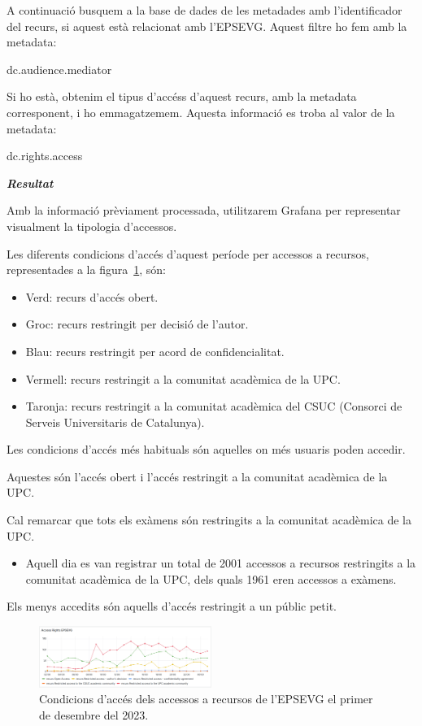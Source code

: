 \documentclass[lettersize,journal]{IEEEtran}
\begin{document}
A continuació busquem a la base de dades de les metadades amb l'identificador del recurs, si aquest està relacionat amb l'EPSEVG.
Aquest filtre ho fem amb la metadata:
\begin{center}
    {dc.audience.mediator}
\end{center}

Si ho està, obtenim el tipus d'accéss d'aquest recurs, amb la metadata corresponent, i ho emmagatzemem.
Aquesta informació es troba al valor de la metadata:
\begin{center}
    {dc.rights.access}
\end{center}

\textit{\textbf{Resultat}}

Amb la informació prèviament processada, utilitzarem Grafana per representar visualment la tipologia d'accessos.

Les diferents condicions d'accés d'aquest període per accessos a recursos, representades a la figura~\ref{fig:log-access-type}, són:
\begin{itemize}
    \item Verd: recurs d'accés obert.
    \item Groc: recurs restringit per decisió de l'autor.
    \item Blau: recurs restringit per acord de confidencialitat.
    \item Vermell: recurs restringit a la comunitat acadèmica de la UPC.
    \item Taronja: recurs restringit a la comunitat acadèmica del CSUC (Consorci de Serveis Universitaris de Catalunya).
\end{itemize}

Les condicions d'accés més habituals són aquelles on més usuaris poden accedir.

Aquestes són l'accés obert i l'accés restringit a la comunitat acadèmica de la UPC.

Cal remarcar que tots els exàmens són restringits a la comunitat acadèmica de la UPC.
\begin{itemize}
    \item Aquell dia es van registrar un total de 2001 accessos a recursos restringits a la comunitat acadèmica de la UPC, dels quals 1961 eren accessos a exàmens.
\end{itemize}

Els menys accedits són aquells d'accés restringit a un públic petit.

\begin{figure}[!t]
    \centerline{\includegraphics[width=0.5\textwidth]{figures/access-rights-epsevg}}
    \caption{Condicions d'accés dels accessos a recursos de l'EPSEVG el primer de desembre del 2023.}\label{fig:log-access-type}
\end{figure}
\end{document}
